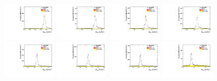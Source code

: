 \begin{figure}[h]\centering
    \includegraphics[width=0.24\textwidth]{figure/full_mbc/output_4600_mBC.pdf}
    \includegraphics[width=0.24\textwidth]{figure/full_mbc/output_4612_mBC.pdf}
    \includegraphics[width=0.24\textwidth]{figure/full_mbc/output_4626_mBC.pdf}
    \includegraphics[width=0.24\textwidth]{figure/full_mbc/output_4640_mBC.pdf}
    \includegraphics[width=0.24\textwidth]{figure/full_mbc/output_4660_mBC.pdf}
    \includegraphics[width=0.24\textwidth]{figure/full_mbc/output_4680_mBC.pdf}
    \includegraphics[width=0.24\textwidth]{figure/full_mbc/output_4700_mBC.pdf}
    \includegraphics[width=0.24\textwidth]{figure/full_mbc/output_4740_mBC.pdf}

\end{figure}
